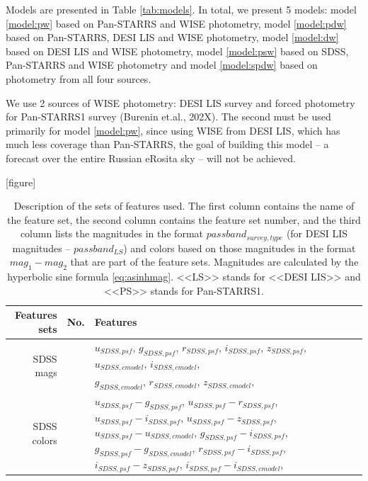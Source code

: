 \documentclass[fleqn,usenatbib]{mnras}
\begin{document}
Models are presented in Table \ref{tab:models}. In total, we present 5 models: model \ref{model:pw} based on Pan-STARRS and WISE photometry, model \ref{model:pdw} based on Pan-STARRS, DESI LIS and WISE photometry, model \ref{model:dw} based on DESI LIS and WISE photometry, model \ref{model:psw} based on SDSS, Pan-STARRS and WISE photometry and model \ref{model:spdw} based on photometry from all four sources.

We use 2 sources of WISE photometry: DESI LIS survey and forced photometry for Pan-STARRS1 survey (Burenin et.al., 202X). The second must be used primarily for model \ref{model:pw}, since using WISE from DESI LIS, which has much less coverage than Pan-STARRS, the goal of building this model -- a forecast over the entire Russian eRosita sky -- will not be achieved.

\begin{table}
    \label{tab:featuressets}
    \caption{Description of the sets of features used. The first column contains the name of the feature set, the second column contains the feature set number, and the third column lists the magnitudes in the format $passband_{survey, type}$ (for DESI LIS magnitudes -- $passband_{LS}$) and colors based on those magnitudes in the format $mag_1 - mag_2$ that are part of the feature sets. Magnitudes are calculated by the hyperbolic sine formula \eqref{eq:asinhmag}. <<LS>> stands for <<DESI LIS>> and <<PS>> stands for Pan-STARRS1.}
    [figure] 
    \renewcommand{\theFeatsSetNumber}{\arabic{FeatsSetNumber}}
    \setcounter{FeatsSetNumber}{0}
	\begin{tabular}{ r l p{10cm} }
	\hline
	    Features sets & No. & Features \\
    \hline
        \multirow{2}{*}{SDSS mags} & {FeatsSetNumber}\theFeatsSetNumber\label{feats:sdss-mags-1} & \(u_{SDSS,psf}\), \(g_{SDSS,psf}\), \(r_{SDSS,psf}\), \(i_{SDSS,psf}\), \(z_{SDSS,psf}\), \(u_{SDSS,cmodel}\), \(i_{SDSS,cmodel}\), \\
         & {FeatsSetNumber}\theFeatsSetNumber\label{feats:sdss-mags-2} & \(g_{SDSS,cmodel}\), \(r_{SDSS,cmodel}\), \(z_{SDSS,cmodel}\), \\
        \multirow{2}{*}{SDSS colors} & {FeatsSetNumber}\theFeatsSetNumber\label{feats:sdss-colors-1} & \(u_{SDSS,psf}-g_{SDSS,psf}\), \(u_{SDSS,psf}-r_{SDSS,psf}\), \(u_{SDSS,psf}-i_{SDSS,psf}\), \(u_{SDSS,psf}-z_{SDSS,psf}\), \(u_{SDSS,psf}-u_{SDSS,cmodel}\), \(g_{SDSS,psf}-i_{SDSS,psf}\), \(g_{SDSS,psf}-g_{SDSS,cmodel}\), \(r_{SDSS,psf}-i_{SDSS,psf}\), \(i_{SDSS,psf}-z_{SDSS,psf}\), \(i_{SDSS,psf}-i_{SDSS,cmodel}\), \\

\end{tabular}
\end{table}
\end{document}
